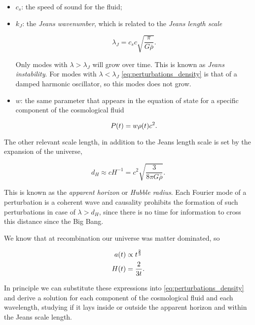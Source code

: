 \begin{itemize}
        \item $c_s$: the speed of sound for the fluid;
        \item $k_J$: the \emph{Jeans wavenumber}, which is related to the
        \emph{Jeans length scale}

        \begin{equation}
                \lambda_J = c_s c \sqrt{\frac{\pi}{G \bar \rho}}. 
        \end{equation}

        Only modes with $\lambda > \lambda_J$ will grow over time. This is
        known as \emph{Jeans instability}.
        For modes with $\lambda < \lambda_J$
        \autoref{eq:perturbations_density} is that of a damped harmonic
        oscillator, so this modes does not grow.

        \item $w$: the same parameter that appears in the equation of state
        for a specific component of the cosmological fluid

        \begin{equation}
                P\qty(t) = w \rho\qty(t) c^2. 
        \end{equation}
\end{itemize}

The other relevant scale length, in addition to the Jeans length scale is
set by the expansion of the universe,

\begin{equation}
        d_H \approx cH^{-1} = c^2 \sqrt{\frac{3}{8\pi G \bar \rho}}. 
\end{equation}

This is known as the \emph{apparent horizon} or \emph{Hubble radius}.
Each Fourier mode of a perturbation
is a coherent wave and causality prohibits the formation of such perturbations
in case of $\lambda > d_H$, since there is no time for information to cross
this distance since the Big Bang. 

We know that at recombination our universe was matter dominated, so

\begin{align}
        a\qty(t) & \propto t^\frac{2}{3} \\
        H\qty(t) & = \frac{2}{3t}.
\end{align}

In principle we can substitute these expressions into
\autoref{eq:perturbations_density} and derive a solution for each component
of the cosmological fluid and each wavelength, studying if it lays inside
or outside the apparent horizon and within the Jeans scale length.

